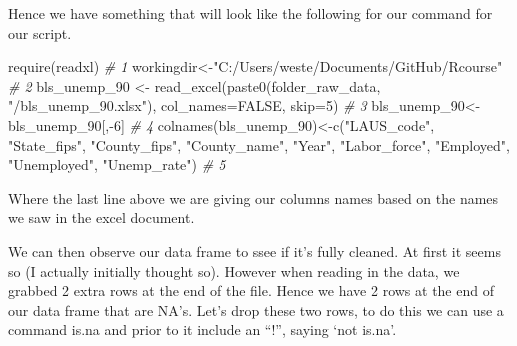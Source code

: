 \documentclass[
]{book}
\newenvironment{Shaded}{\begin{snugshade}}{\end{snugshade}}
\newcommand{\AttributeTok}[1]{\textcolor[rgb]{0.77,0.63,0.00}{#1}}
\newcommand{\CommentTok}[1]{\textcolor[rgb]{0.56,0.35,0.01}{\textit{#1}}}
\newcommand{\ConstantTok}[1]{\textcolor[rgb]{0.00,0.00,0.00}{#1}}
\newcommand{\DecValTok}[1]{\textcolor[rgb]{0.00,0.00,0.81}{#1}}
\newcommand{\FunctionTok}[1]{\textcolor[rgb]{0.00,0.00,0.00}{#1}}
\newcommand{\NormalTok}[1]{#1}
\newcommand{\OtherTok}[1]{\textcolor[rgb]{0.56,0.35,0.01}{#1}}
\newcommand{\SpecialCharTok}[1]{\textcolor[rgb]{0.00,0.00,0.00}{#1}}
\newcommand{\StringTok}[1]{\textcolor[rgb]{0.31,0.60,0.02}{#1}}
\begin{document}
Hence we have something that will look like the following for our command for our script.

\begin{Shaded}
\begin{Highlighting}[]
\FunctionTok{require}\NormalTok{(readxl)                                                                                                                                    }\CommentTok{\# 1}
\NormalTok{workingdir}\OtherTok{\textless{}{-}}\StringTok{"C:/Users/weste/Documents/GitHub/Rcourse"}                                                                                              \CommentTok{\# 2}
\NormalTok{bls\_unemp\_90 }\OtherTok{\textless{}{-}} \FunctionTok{read\_excel}\NormalTok{(}\FunctionTok{paste0}\NormalTok{(folder\_raw\_data, }\StringTok{"/bls\_unemp\_90.xlsx"}\NormalTok{), }\AttributeTok{col\_names=}\ConstantTok{FALSE}\NormalTok{, }\AttributeTok{skip=}\DecValTok{5}\NormalTok{)                                                 }\CommentTok{\# 3}
\NormalTok{bls\_unemp\_90}\OtherTok{\textless{}{-}}\NormalTok{bls\_unemp\_90[,}\SpecialCharTok{{-}}\DecValTok{6}\NormalTok{]                                                                                                                    }\CommentTok{\# 4}
\FunctionTok{colnames}\NormalTok{(bls\_unemp\_90)}\OtherTok{\textless{}{-}}\FunctionTok{c}\NormalTok{(}\StringTok{"LAUS\_code"}\NormalTok{, }\StringTok{"State\_fips"}\NormalTok{, }\StringTok{"County\_fips"}\NormalTok{, }\StringTok{"County\_name"}\NormalTok{, }\StringTok{"Year"}\NormalTok{, }\StringTok{"Labor\_force"}\NormalTok{, }\StringTok{"Employed"}\NormalTok{, }\StringTok{"Unemployed"}\NormalTok{, }\StringTok{"Unemp\_rate"}\NormalTok{)  }\CommentTok{\# 5}
\end{Highlighting}
\end{Shaded}

Where the last line above we are giving our columns names based on the names we saw in the excel document.

We can then observe our data frame to ssee if it's fully cleaned. At first it seems so (I actually initially thought so). However when reading in the data, we grabbed 2 extra rows at the end of the file. Hence we have 2 rows at the end of our data frame that are NA's. Let's drop these two rows, to do this we can use a command is.na and prior to it include an ``!'', saying `not is.na'.

\begin{Shaded}
\end{Shaded}
\end{document}
